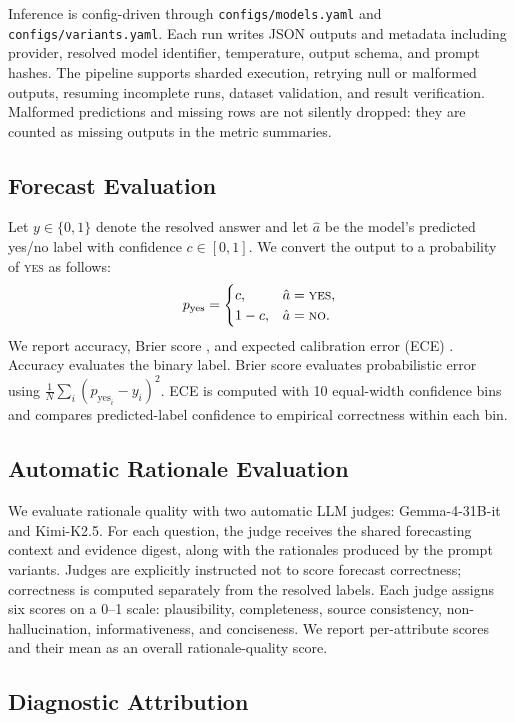 \documentclass[11pt]{article}
\newcommand{\yesprob}{p_{\mathrm{yes}}}
\begin{document}
Inference is config-driven through \texttt{configs/models.yaml} and \texttt{configs/variants.yaml}.
Each run writes JSON outputs and metadata including provider, resolved model identifier, temperature, output schema, and prompt hashes.
The pipeline supports sharded execution, retrying null or malformed outputs, resuming incomplete runs, dataset validation, and result verification.
Malformed predictions and missing rows are not silently dropped: they are counted as missing outputs in the metric summaries.

\subsection{Forecast Evaluation}

Let $y \in \{0,1\}$ denote the resolved answer and let $\hat{a}$ be the model's predicted yes/no label with confidence $c \in [0,1]$.
We convert the output to a probability of \textsc{yes} as follows:
\[
\yesprob =
\begin{cases}
c, & \hat{a}=\textsc{yes},\\
1-c, & \hat{a}=\textsc{no}.
\end{cases}
\]
We report accuracy, Brier score \cite{brier1950verification}, and expected calibration error (ECE) \cite{guo2017calibration}.
Accuracy evaluates the binary label.
Brier score evaluates probabilistic error using $\frac{1}{N}\sum_i(\yesprob_i-y_i)^2$.
ECE is computed with 10 equal-width confidence bins and compares predicted-label confidence to empirical correctness within each bin.

\subsection{Automatic Rationale Evaluation}

We evaluate rationale quality with two automatic LLM judges: Gemma-4-31B-it and Kimi-K2.5.
For each question, the judge receives the shared forecasting context and evidence digest, along with the rationales produced by the prompt variants.
Judges are explicitly instructed not to score forecast correctness; correctness is computed separately from the resolved labels.
Each judge assigns six scores on a 0--1 scale: plausibility, completeness, source consistency, non-hallucination, informativeness, and conciseness.
We report per-attribute scores and their mean as an overall rationale-quality score.

\subsection{Diagnostic Attribution}
\end{document}
